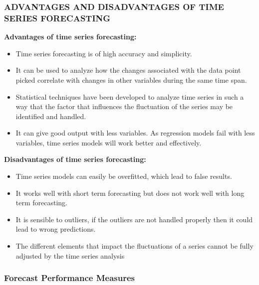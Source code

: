 \documentclass[
  onepage,
  openany]{scrbook}
\begin{document}
\hypertarget{advantages-and-disadvantages-of-time-series-forecasting}{%
\subsubsection{\texorpdfstring{\textsc{\textbf{ADVANTAGES AND
DISADVANTAGES OF TIME SERIES
FORECASTING}}}{ADVANTAGES AND DISADVANTAGES OF TIME SERIES FORECASTING}}\label{advantages-and-disadvantages-of-time-series-forecasting}}

\textbf{Advantages of time series forecasting:}

\begin{itemize}
\item
  Time series forecasting is of high accuracy and simplicity.
\item
  It can be used to analyze how the changes associated with the data
  point picked correlate with changes in other variables during the same
  time span.
\item
  Statistical techniques have been developed to analyze time series in
  such a way that the factor that influences the fluctuation of the
  series may be identified and handled.
\item
  It can give good output with less variables. As regression models fail
  with less variables, time series models will work better and
  effectively.
\end{itemize}

\textbf{Disadvantages of time series forecasting:}

\begin{itemize}
\item
  Time series models can easily be overfitted, which lead to false
  results.
\item
  It works well with short term forecasting but does not work well with
  long term forecasting.
\item
  It is sensible to outliers, if the outliers are not handled properly
  then it could lead to wrong predictions.
\item
  The different elements that impact the fluctuations of a series cannot
  be fully adjusted by the time series analysis
\end{itemize}

\hypertarget{forecast-performance-measures}{%
\subsubsection{Forecast Performance
Measures}\label{forecast-performance-measures}}
\end{document}
